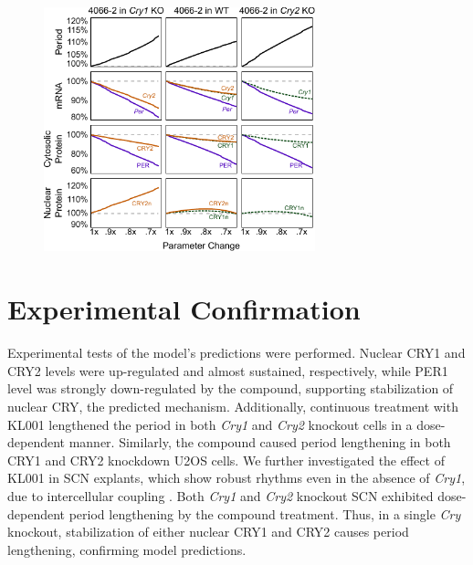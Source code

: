  \begin{figure}[bt]
    \centering
    \begin{minipage}{0.9\textwidth}
      \centering
      \includegraphics[width=0.7\textwidth]{chap2/figures/prediction.pdf}
       \label{fig:40662prediction}
    \end{minipage}
  \end{figure}

  \section{Experimental Confirmation}
  Experimental tests of the model's predictions were performed. Nuclear CRY1 and CRY2 levels were up-regulated and almost sustained, respectively, while PER1 level was strongly down-regulated by the compound, supporting stabilization of nuclear CRY, the predicted mechanism. Additionally, continuous treatment with KL001 lengthened the period in both {\it Cry1} and {\it Cry2} knockout cells in a dose-dependent manner. Similarly, the compound caused period lengthening in both CRY1 and CRY2 knockdown U2OS cells. We further investigated the effect of KL001 in SCN explants, which show robust rhythms even in the absence of {\it Cry1}, due to intercellular coupling \cite{Liu2007}. Both {\it Cry1} and {\it Cry2} knockout SCN exhibited dose-dependent period lengthening by the compound treatment. Thus, in a single {\it Cry} knockout, stabilization of either nuclear CRY1 and CRY2 causes period lengthening, confirming model predictions.

